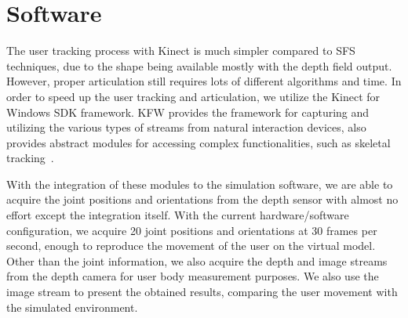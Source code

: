 \section{Software}

The user tracking process with Kinect is much simpler compared to SFS techniques, due to the shape being available mostly with the depth field output. However, proper articulation still requires lots of different algorithms and time. In order to speed up the user tracking and articulation, we utilize the Kinect for Windows SDK framework. KFW provides the framework for capturing and utilizing the various types of streams from natural interaction devices, also provides abstract modules for accessing complex functionalities, such as skeletal tracking~\cite{OpenNI2102}. 

With the integration of these modules to the simulation software, we are able to acquire the joint positions and orientations from the depth sensor with almost no effort except the integration itself. With the current hardware/software configuration, we acquire 20 joint positions and orientations at 30 frames per second, enough to reproduce the movement of the user on the virtual model. Other than the joint information, we also acquire the depth and image streams from the depth camera for user body measurement purposes. We also use the image stream to present the obtained results, comparing the user movement with the simulated environment.
